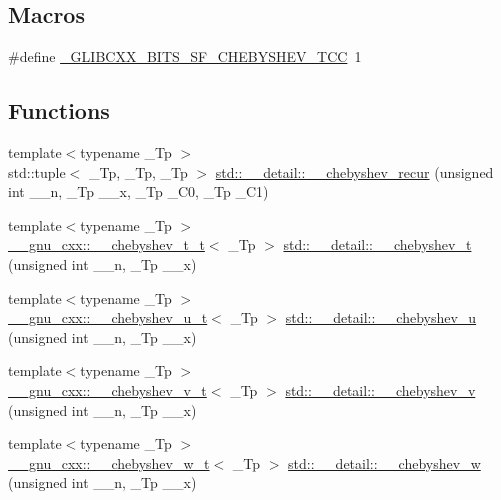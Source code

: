 \subsection*{Macros}
\begin{DoxyCompactItemize}
\item 
\#define \hyperlink{sf__chebyshev_8tcc_af93a8a3778aadae3937c7f4b1aa86123}{\+\_\+\+G\+L\+I\+B\+C\+X\+X\+\_\+\+B\+I\+T\+S\+\_\+\+S\+F\+\_\+\+C\+H\+E\+B\+Y\+S\+H\+E\+V\+\_\+\+T\+CC}~1
\end{DoxyCompactItemize}
\subsection*{Functions}
\begin{DoxyCompactItemize}
\item 
{\footnotesize template$<$typename \+\_\+\+Tp $>$ }\\std\+::tuple$<$ \+\_\+\+Tp, \+\_\+\+Tp, \+\_\+\+Tp $>$ \hyperlink{namespacestd_1_1____detail_a5fa9d67b4e0af4e0e018a06d198f0280}{std\+::\+\_\+\+\_\+detail\+::\+\_\+\+\_\+chebyshev\+\_\+recur} (unsigned int \+\_\+\+\_\+n, \+\_\+\+Tp \+\_\+\+\_\+x, \+\_\+\+Tp \+\_\+\+C0, \+\_\+\+Tp \+\_\+\+C1)
\item 
{\footnotesize template$<$typename \+\_\+\+Tp $>$ }\\\hyperlink{struct____gnu__cxx_1_1____chebyshev__t__t}{\+\_\+\+\_\+gnu\+\_\+cxx\+::\+\_\+\+\_\+chebyshev\+\_\+t\+\_\+t}$<$ \+\_\+\+Tp $>$ \hyperlink{namespacestd_1_1____detail_ac23b4d357a95f4ba24503350999fd52d}{std\+::\+\_\+\+\_\+detail\+::\+\_\+\+\_\+chebyshev\+\_\+t} (unsigned int \+\_\+\+\_\+n, \+\_\+\+Tp \+\_\+\+\_\+x)
\item 
{\footnotesize template$<$typename \+\_\+\+Tp $>$ }\\\hyperlink{struct____gnu__cxx_1_1____chebyshev__u__t}{\+\_\+\+\_\+gnu\+\_\+cxx\+::\+\_\+\+\_\+chebyshev\+\_\+u\+\_\+t}$<$ \+\_\+\+Tp $>$ \hyperlink{namespacestd_1_1____detail_a0ed32bbc4a1eaf32dc1dc5f423527008}{std\+::\+\_\+\+\_\+detail\+::\+\_\+\+\_\+chebyshev\+\_\+u} (unsigned int \+\_\+\+\_\+n, \+\_\+\+Tp \+\_\+\+\_\+x)
\item 
{\footnotesize template$<$typename \+\_\+\+Tp $>$ }\\\hyperlink{struct____gnu__cxx_1_1____chebyshev__v__t}{\+\_\+\+\_\+gnu\+\_\+cxx\+::\+\_\+\+\_\+chebyshev\+\_\+v\+\_\+t}$<$ \+\_\+\+Tp $>$ \hyperlink{namespacestd_1_1____detail_a2ed217a1032c75d07ff34949de36d653}{std\+::\+\_\+\+\_\+detail\+::\+\_\+\+\_\+chebyshev\+\_\+v} (unsigned int \+\_\+\+\_\+n, \+\_\+\+Tp \+\_\+\+\_\+x)
\item 
{\footnotesize template$<$typename \+\_\+\+Tp $>$ }\\\hyperlink{struct____gnu__cxx_1_1____chebyshev__w__t}{\+\_\+\+\_\+gnu\+\_\+cxx\+::\+\_\+\+\_\+chebyshev\+\_\+w\+\_\+t}$<$ \+\_\+\+Tp $>$ \hyperlink{namespacestd_1_1____detail_ab2a0ec347e56c0fae435c8da507c578c}{std\+::\+\_\+\+\_\+detail\+::\+\_\+\+\_\+chebyshev\+\_\+w} (unsigned int \+\_\+\+\_\+n, \+\_\+\+Tp \+\_\+\+\_\+x)
\end{DoxyCompactItemize}


